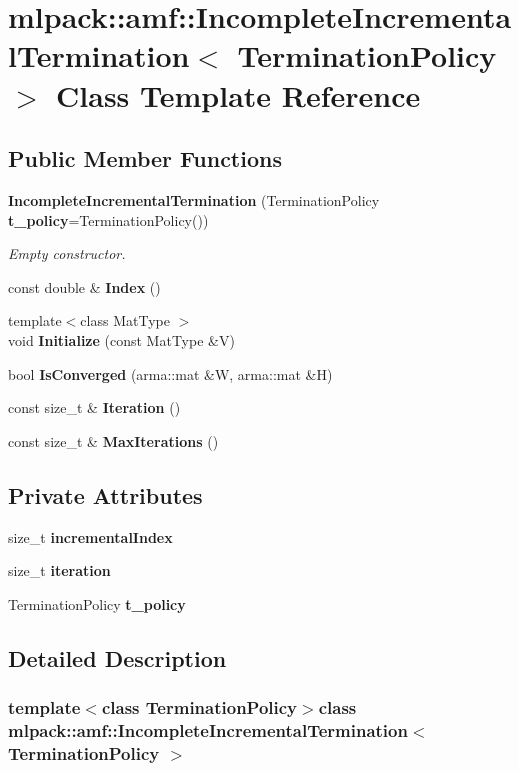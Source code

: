 \section{mlpack\-:\-:amf\-:\-:Incomplete\-Incremental\-Termination$<$ Termination\-Policy $>$ Class Template Reference}
\label{classmlpack_1_1amf_1_1IncompleteIncrementalTermination}
\subsection*{Public Member Functions}
\begin{DoxyCompactItemize}
\item 
{\bf Incomplete\-Incremental\-Termination} (Termination\-Policy {\bf t\-\_\-policy}=Termination\-Policy())
\begin{DoxyCompactList}\small\item\em Empty constructor. \end{DoxyCompactList}\item 
const double \& {\bf Index} ()
\item 
{\footnotesize template$<$class Mat\-Type $>$ }\\void {\bf Initialize} (const Mat\-Type \&V)
\item 
bool {\bf Is\-Converged} (arma\-::mat \&W, arma\-::mat \&H)
\item 
const size\-\_\-t \& {\bf Iteration} ()
\item 
const size\-\_\-t \& {\bf Max\-Iterations} ()
\end{DoxyCompactItemize}
\subsection*{Private Attributes}
\begin{DoxyCompactItemize}
\item 
size\-\_\-t {\bf incremental\-Index}
\item 
size\-\_\-t {\bf iteration}
\item 
Termination\-Policy {\bf t\-\_\-policy}
\end{DoxyCompactItemize}


\subsection{Detailed Description}
\subsubsection*{template$<$class Termination\-Policy$>$class mlpack\-::amf\-::\-Incomplete\-Incremental\-Termination$<$ Termination\-Policy $>$}



